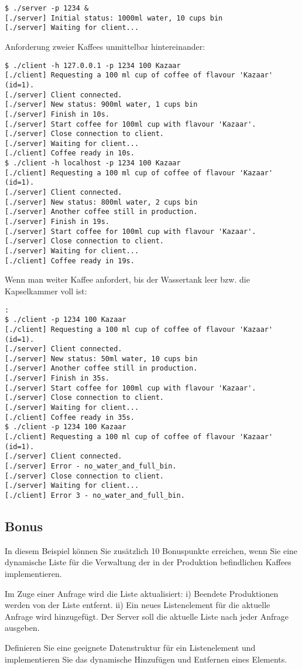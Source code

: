 \begin{lstlisting}
$ ./server -p 1234 &
[./server] Initial status: 1000ml water, 10 cups bin
[./server] Waiting for client...
\end{lstlisting}
%
Anforderung zweier Kaffees unmittelbar hintereinander:
%
\begin{lstlisting}
$ ./client -h 127.0.0.1 -p 1234 100 Kazaar
[./client] Requesting a 100 ml cup of coffee of flavour 'Kazaar' (id=1).
[./server] Client connected.
[./server] New status: 900ml water, 1 cups bin
[./server] Finish in 10s.
[./server] Start coffee for 100ml cup with flavour 'Kazaar'.
[./server] Close connection to client.
[./server] Waiting for client...
[./client] Coffee ready in 10s.
$ ./client -h localhost -p 1234 100 Kazaar
[./client] Requesting a 100 ml cup of coffee of flavour 'Kazaar' (id=1).
[./server] Client connected.
[./server] New status: 800ml water, 2 cups bin
[./server] Another coffee still in production.
[./server] Finish in 19s.
[./server] Start coffee for 100ml cup with flavour 'Kazaar'.
[./server] Close connection to client.
[./server] Waiting for client...
[./client] Coffee ready in 19s.
\end{lstlisting}
%
Wenn man weiter Kaffee anfordert, bis der Wassertank leer bzw. die Kapselkammer
voll ist:
%
\begin{lstlisting}
:
$ ./client -p 1234 100 Kazaar
[./client] Requesting a 100 ml cup of coffee of flavour 'Kazaar' (id=1).
[./server] Client connected.
[./server] New status: 50ml water, 10 cups bin
[./server] Another coffee still in production.
[./server] Finish in 35s.
[./server] Start coffee for 100ml cup with flavour 'Kazaar'.
[./server] Close connection to client.
[./server] Waiting for client...
[./client] Coffee ready in 35s.
$ ./client -p 1234 100 Kazaar
[./client] Requesting a 100 ml cup of coffee of flavour 'Kazaar' (id=1).
[./server] Client connected.
[./server] Error - no_water_and_full_bin.
[./server] Close connection to client.
[./server] Waiting for client...
[./client] Error 3 - no_water_and_full_bin.
\end{lstlisting}

\subsection*{Bonus}

In diesem Beispiel können Sie zusätzlich 10 Bonuspunkte erreichen, wenn Sie
eine dynamische Liste für die Verwaltung der in der Produktion befindlichen
Kaffees implementieren.

Im Zuge einer Anfrage wird die Liste aktualisiert: i) Beendete Produktionen
werden von der Liste entfernt. ii) Ein neues Listenelement für die aktuelle
Anfrage wird hinzugefügt. Der Server soll die aktuelle Liste nach jeder Anfrage
ausgeben.

Definieren Sie eine geeignete Datenstruktur für ein Listenelement und
implementieren Sie das dynamische Hinzufügen und Entfernen eines Elements.


\osueguidelinesone



